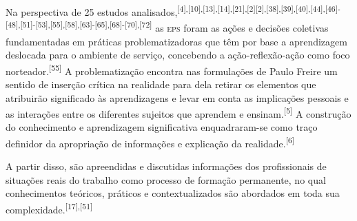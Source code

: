 \documentclass{article}
\begin{document}
Na perspectiva de 25 estudos analisados,\textsuperscript{[}\textsuperscript{4}\textsuperscript{]}\textsuperscript{,}\textsuperscript{[}\textsuperscript{10}\textsuperscript{]}\textsuperscript{,}\textsuperscript{[}\textsuperscript{13}\textsuperscript{]}\textsuperscript{,}\textsuperscript{[}\textsuperscript{14}\textsuperscript{]}\textsuperscript{,}\textsuperscript{[}\textsuperscript{21}\textsuperscript{]}\textsuperscript{,}\textsuperscript{[}\textsuperscript{2}\textsuperscript{]}\textsuperscript{[}\textsuperscript{2}\textsuperscript{]}\textsuperscript{,}\textsuperscript{[}\textsuperscript{38}\textsuperscript{]}\textsuperscript{,}\textsuperscript{[}\textsuperscript{39}\textsuperscript{]}\textsuperscript{,}\textsuperscript{[}\textsuperscript{40}\textsuperscript{]}\textsuperscript{,}\textsuperscript{[}\textsuperscript{44}\textsuperscript{]}\textsuperscript{,}\textsuperscript{[}\textsuperscript{46}\textsuperscript{]}\textsuperscript{-}\textsuperscript{[}\textsuperscript{48}\textsuperscript{]}\textsuperscript{,}\textsuperscript{[}\textsuperscript{51}\textsuperscript{]}\textsuperscript{-}\textsuperscript{[}\textsuperscript{53}\textsuperscript{]}\textsuperscript{,}\textsuperscript{[}\textsuperscript{55}\textsuperscript{]}\textsuperscript{,}\textsuperscript{[}\textsuperscript{58}\textsuperscript{]}\textsuperscript{,}\textsuperscript{[}\textsuperscript{63}\textsuperscript{]}\textsuperscript{-}\textsuperscript{[}\textsuperscript{65}\textsuperscript{]}\textsuperscript{,}\textsuperscript{[}\textsuperscript{68}\textsuperscript{]}\textsuperscript{-}\textsuperscript{[}\textsuperscript{70}\textsuperscript{]}\textsuperscript{,}\textsuperscript{[}\textsuperscript{72}\textsuperscript{]}
as \textsc{eps} foram as ações e decisões coletivas fundamentadas em práticas
problematizadoras que têm por base a aprendizagem deslocada para o ambiente de
serviço, concebendo a ação-reflexão-ação como foco norteador.\textsuperscript{[}\textsuperscript{55}\textsuperscript{]}
A problematização encontra nas formulações de Paulo Freire um sentido de
inserção crítica na realidade para dela retirar os elementos que atribuirão
significado às aprendizagens e levar em conta as implicações pessoais e as
interações entre os diferentes sujeitos que aprendem e ensinam.\textsuperscript{[}\textsuperscript{5}\textsuperscript{]}
A construção do conhecimento e aprendizagem significativa enquadraram-se como
traço definidor da apropriação de informações e explicação da realidade.\textsuperscript{[}\textsuperscript{6}\textsuperscript{]}

A partir disso, são apreendidas e discutidas informações dos profissionais de
situações reais do trabalho como processo de formação permanente, no qual
conhecimentos teóricos, práticos e contextualizados são abordados em toda sua
complexidade.\textsuperscript{[}\textsuperscript{17}\textsuperscript{]}\textsuperscript{,}\textsuperscript{[}\textsuperscript{51}\textsuperscript{]}
\end{document}
